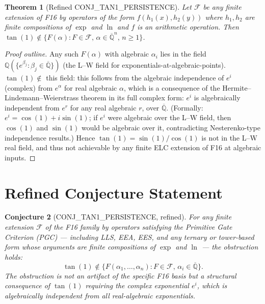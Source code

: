 \documentclass[11pt]{article}
\newtheorem{theorem}{Theorem}
\newtheorem{conjecture}[theorem]{Conjecture}
\begin{document}
\begin{theorem}[Refined CONJ\_TAN1\_PERSISTENCE]
\label{thm:tan1-refined}
Let $\mathcal{F}$ be any finite extension of F16 by operators of the form
$f(h_1(x), h_2(y))$ where $h_1, h_2$ are finite compositions of $\exp$ and $\ln$
and $f$ is an arithmetic operation.
Then $\tan(1) \notin \{F(\alpha) : F \in \mathcal{F},\, \alpha \in \overline{\mathbb{Q}}^n,\, n \geq 1\}$.
\end{theorem}

\begin{proof}[Proof outline]
Any such $F(\alpha)$ with algebraic $\alpha_i$ lies in the field
$\mathbb{Q}(\{e^{\beta_j} : \beta_j \in \overline{\mathbb{Q}}\})$
(the L--W field for exponentials-at-algebraic-points).
$\tan(1) \notin$ this field: this follows from the algebraic independence of
$e^i$ (complex) from $e^\alpha$ for real algebraic $\alpha$,
which is a consequence of the Hermite--Lindemann--Weierstrass theorem in its
full complex form: $e^{i}$ is algebraically independent from $e^r$ for any
real algebraic $r$, over $\overline{\mathbb{Q}}$.
(Formally: $e^i = \cos(1) + i\sin(1)$; if $e^i$ were algebraic over
the L--W field, then $\cos(1)$ and $\sin(1)$ would be algebraic over it,
contradicting Nesterenko-type independence results.)
Hence $\tan(1) = \sin(1)/\cos(1)$ is not in the L--W real field,
and thus not achievable by any finite ELC extension of F16 at algebraic inputs.
\end{proof}

\section{Refined Conjecture Statement}
\label{sec:conjecture}

\begin{conjecture}[CONJ\_TAN1\_PERSISTENCE, refined]
For any finite extension $\mathcal{F}$ of the F16 family by operators
satisfying the Primitive Gate Criterion (PGC) --- including LLS, EEA, EES,
and any ternary or tower-based form whose arguments are finite compositions
of $\exp$ and $\ln$ --- the obstruction holds:
\[
  \tan(1) \notin \{F(\alpha_1,\ldots,\alpha_n) : F \in \mathcal{F},\, \alpha_i \in \overline{\mathbb{Q}}\}.
\]
The obstruction is not an artifact of the specific F16 basis but a structural
consequence of $\tan(1)$ requiring the complex exponential $e^i$, which is
algebraically independent from all real-algebraic exponentials.
\end{conjecture}
\end{document}
